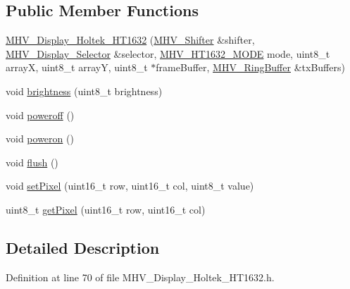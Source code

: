 \subsection*{\-Public \-Member \-Functions}
\begin{DoxyCompactItemize}
\item 
\hyperlink{class_m_h_v___display___holtek___h_t1632_a584fae17d4902a8464a30f3b06e86811}{\-M\-H\-V\-\_\-\-Display\-\_\-\-Holtek\-\_\-\-H\-T1632} (\hyperlink{class_m_h_v___shifter}{\-M\-H\-V\-\_\-\-Shifter} \&shifter, \hyperlink{class_m_h_v___display___selector}{\-M\-H\-V\-\_\-\-Display\-\_\-\-Selector} \&selector, \hyperlink{_m_h_v___display___holtek___h_t1632_8h_a49097ad6362d784be39f7e83f5359011}{\-M\-H\-V\-\_\-\-H\-T1632\-\_\-\-M\-O\-D\-E} mode, uint8\-\_\-t array\-X, uint8\-\_\-t array\-Y, uint8\-\_\-t $\ast$frame\-Buffer, \hyperlink{class_m_h_v___ring_buffer}{\-M\-H\-V\-\_\-\-Ring\-Buffer} \&tx\-Buffers)
\item 
void \hyperlink{class_m_h_v___display___holtek___h_t1632_a60620705276f1713dead13a4b440fed4}{brightness} (uint8\-\_\-t brightness)
\item 
void \hyperlink{class_m_h_v___display___holtek___h_t1632_a224e7f735441e8d381fb6148f2b64dda}{poweroff} ()
\item 
void \hyperlink{class_m_h_v___display___holtek___h_t1632_a2a9586d4c16483b4223a2fad453bc6bf}{poweron} ()
\item 
void \hyperlink{class_m_h_v___display___holtek___h_t1632_aeeb460d8c5ba0d8d43fb18779e50258e}{flush} ()
\item 
void \hyperlink{class_m_h_v___display___holtek___h_t1632_a664e9a5744bed3fa50a6adc9fcf80206}{set\-Pixel} (uint16\-\_\-t row, uint16\-\_\-t col, uint8\-\_\-t value)
\item 
uint8\-\_\-t \hyperlink{class_m_h_v___display___holtek___h_t1632_a2bebc937a5951bfeace807368856d0b9}{get\-Pixel} (uint16\-\_\-t row, uint16\-\_\-t col)
\end{DoxyCompactItemize}


\subsection{\-Detailed \-Description}


\-Definition at line 70 of file \-M\-H\-V\-\_\-\-Display\-\_\-\-Holtek\-\_\-\-H\-T1632.\-h.



